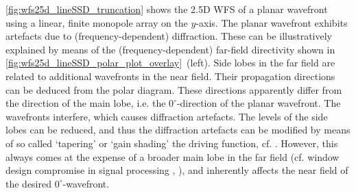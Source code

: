 \myfig\ref{fig:wfs25d_lineSSD_truncation} shows the 2.5D WFS of a planar
wavefront using a linear, finite monopole array on the $y$-axis.
%
The planar wavefront exhibits artefacts due to (frequency-dependent)
diffraction.
%
These can be illustratively explained by means of the (frequency-dependent)
far-field directivity shown in
\myfig\ref{fig:wfs25d_lineSSD_polar_plot_overlay}~(left).
%
Side lobes in the far field are related to additional wavefronts in
the near field.
Their propagation directions can be deduced from the polar diagram.
These directions apparently differ from the direction of the main lobe,
i.e. the $0^\circ$-direction of the planar wavefront.
%
The wavefronts interfere, which causes diffraction artefacts.
%
The levels of the side lobes can be reduced, and thus the diffraction
artefacts can be modified by means of so called `tapering' or
`gain shading' the driving function,
cf. \cite{Vogel1993_diss,Start1997_diss}.
%
However, this always comes at the expense of a broader main lobe
in the far field (cf. window design compromise in signal processing
\cite[Ch.~3.5]{Moeser2009_book}, \cite[Ch.~3]{Trees2002_book}), and
inherently affects the near field of the desired $0^\circ$-wavefront.



